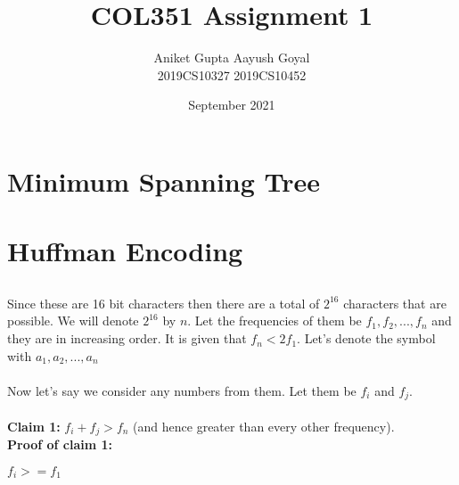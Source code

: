 \documentclass{article}
\title{COL351 Assignment 1}
\author{Aniket Gupta \hspace{2cm}  Aayush Goyal \\
    2019CS10327 \hspace{2.3cm} 2019CS10452}
\date{September 2021}
\begin{document}
\maketitle

\section{Minimum Spanning Tree}
\subsection{}
\subsection{}

\section{Huffman Encoding}
\subsection{}
\subsection{}

Since these are 16 bit characters then there are a total of $2^{16}$ characters that are possible. We will denote $2^{16}$ by $n$. Let the frequencies of them be $f_1, f_2, ... , f_n$ and they are in increasing order. It is given that $f_n < 2f_1$. Let's denote the symbol with $a_1, a_2, ... ,a_n$
\\\\
Now let's say we consider any numbers from them. Let them be $f_i$ and $f_j$. 
\\\\
\textbf{Claim 1:} $f_i+f_j > f_n$ (and hence greater than every other frequency).
\\ 
\textbf{Proof of claim 1:}

$f_i >= f_1$
\end{document}
